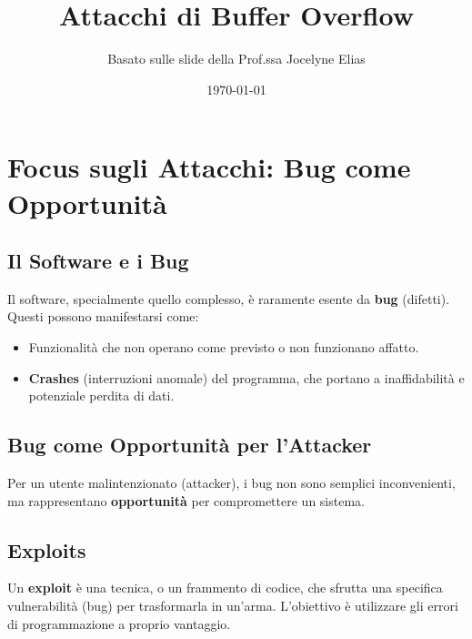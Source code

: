 

\title{Attacchi di Buffer Overflow}
\author{Basato sulle slide della Prof.ssa Jocelyne Elias}
\date{\today}



\maketitle
\tableofcontents
\newpage

\section{Focus sugli Attacchi: Bug come Opportunità}

\subsection{Il Software e i Bug}
Il software, specialmente quello complesso, è raramente esente da \textbf{bug} (difetti).
Questi possono manifestarsi come:
\begin{itemize}
    \item Funzionalità che non operano come previsto o non funzionano affatto.
    \item \textbf{Crashes} (interruzioni anomale) del programma, che portano a inaffidabilità e potenziale perdita di dati.
\end{itemize}

\subsection{Bug come Opportunità per l'Attacker}
Per un utente malintenzionato (attacker), i bug non sono semplici inconvenienti, ma rappresentano \textbf{opportunità} per compromettere un sistema.

\subsection{Exploits}
Un \textbf{exploit} è una tecnica, o un frammento di codice, che sfrutta una specifica vulnerabilità (bug) per trasformarla in un'arma. L'obiettivo è utilizzare gli errori di programmazione a proprio vantaggio.

